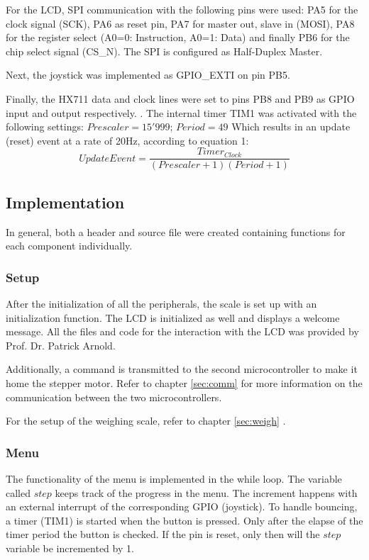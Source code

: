 \documentclass[twocolumn]{article}
\begin{document}
	For the LCD, SPI communication with the following pins were used: PA5 for the clock signal (SCK), PA6 as reset pin, PA7 for master out, slave in (MOSI), PA8 for the register select (A0=0: Instruction, A0=1: Data) and finally PB6 for the chip select signal (CS\_N). The SPI is configured as Half-Duplex Master.
		
	Next, the joystick was implemented as GPIO\_EXTI on pin PB5. 
	
	Finally, the HX711 data and clock lines were set to pins PB8 and PB9 as GPIO input and output respectively.
.
	The internal timer TIM1 was activated with the following settings:\newline
	$Prescaler = 15'999$; $Period = 49$ \newline
	Which results in an update (reset) event at a rate of 20Hz, according to equation 1:
	\begin{equation}
	UpdateEvent = \frac{Timer_{Clock}}{(Prescaler+1)(Period+1)}
	\end{equation}

	 
	\subsection{Implementation}
	In general, both a header and source file were created containing functions for each component individually. 
	\subsubsection{Setup}
	After the initialization of all the peripherals, the scale is set up with an initialization function. The LCD is initialized as well and displays a welcome message. All the files and code for the interaction with the LCD was provided by Prof. Dr. Patrick Arnold.
	
	Additionally, a command is transmitted to the second microcontroller to make it home the stepper motor. Refer to chapter \ref{sec:comm}  for more information on the communication between the two microcontrollers.
	
	For the setup of the weighing scale, refer to chapter \ref{sec:weigh} .
	
	\subsubsection{Menu} \label{sec:menu}
	The functionality of the menu is implemented in the while loop. The variable called $step$ keeps track of the progress in the menu. The increment happens with an external interrupt of the corresponding GPIO (joystick). To handle bouncing, a timer (TIM1) is started when the button is pressed. Only after the elapse of the timer period the button is checked. If the pin is reset, only then will the $step$ variable be incremented by 1.
	
\end{document}
